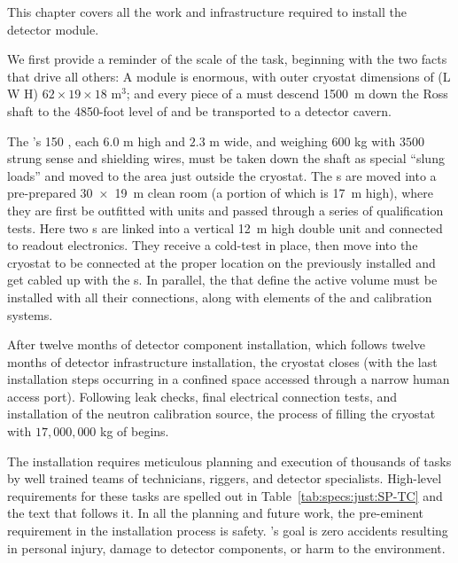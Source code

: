 
This chapter covers all the work and infrastructure required to install the  detector module. 
 
We first provide a reminder of the scale of the task, beginning with the two facts that drive all others: A   module is enormous, with outer cryostat dimensions  of (L W H) 
$62\times 19\times 18$ m$^{3}$; and every piece of a  must descend 
\SI{1500}{m} down the Ross shaft to the 4850-foot level of  and be transported to a detector cavern.


The 's 
150 , each $6.0$ m high and $2.3$ m wide, and  weighing $600$ kg with $3500$ strung sense and shielding wires, must be taken down the shaft as special ``slung loads'' and moved to the area just outside the  cryostat. 
The s are moved into a pre-prepared \SI{30 x 19}{m} clean room (a portion of which is \SI{17}{m} high), where they are first be outfitted  with  units and passed through a series of qualification tests.
Here two s are linked into a vertical \SI{12}{m} high double unit and connected to readout electronics. 
They receive a cold-test in place, then move into the cryostat to be connected at the proper location on the previously installed  and get cabled up with the \fdth{}s. 
In parallel, the  that define the  active volume must be installed with all their  connections, along with  elements of the  and calibration systems.

After twelve months of detector component installation, which follows twelve months of detector infrastructure installation, the cryostat closes (with the last installation steps occurring in a confined space accessed through a narrow human access port). 
Following leak checks, final electrical connection tests, and installation of the neutron calibration source, the process of filling the cryostat with $17,000,000$ kg of  begins.

The installation requires meticulous planning and execution of thousands of tasks by well trained teams of technicians, riggers, and detector specialists. 
High-level requirements for these tasks are spelled out in Table~\ref{tab:specs:just:SP-TC} and the text that follows it. 
In all the planning and future work, the pre-eminent requirement in the installation process is safety.
's goal is zero accidents resulting in personal injury, damage to detector components, or harm to the environment.


